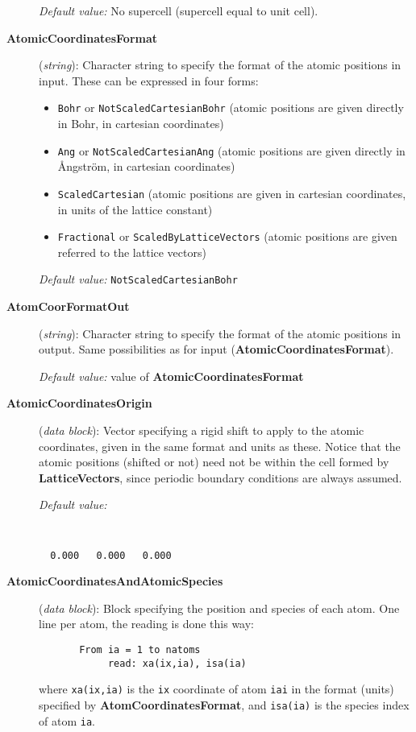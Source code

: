 \documentclass[11pt]{article}
\begin{document}
\begin{description}
{\it Default value:} No supercell (supercell equal to unit cell).


\item[{\bf AtomicCoordinatesFormat}] ({\it string}): 
Character string to specify the format of the atomic positions in
input. These can be expressed in four forms:
\begin{itemize}
\item {\tt Bohr} or {\tt NotScaledCartesianBohr} (atomic positions 
are given directly in Bohr, in cartesian coordinates)
\item {\tt Ang} or {\tt NotScaledCartesianAng} (atomic positions 
are given directly in {\AA}ngstr\"om, in cartesian coordinates)
\item {\tt ScaledCartesian} (atomic positions are given 
in cartesian coordinates, in units of the lattice constant)
\item {\tt Fractional} or {\tt ScaledByLatticeVectors} (atomic positions 
are given referred to the lattice vectors)
\end{itemize}

{\it Default value:} {\tt NotScaledCartesianBohr}


\item[{\bf AtomCoorFormatOut}] ({\it string}): 
Character string to specify the format of the atomic positions in output.
Same possibilities as for input ({\bf AtomicCoordinatesFormat}).

{\it Default value:} value of {\bf AtomicCoordinatesFormat}


\item[{\bf AtomicCoordinatesOrigin}] ({\it data block}): 
Vector specifying a rigid shift to apply to the atomic coordinates,
given in the same format and units as these. Notice that the atomic
positions (shifted or not) need not be within the cell formed by
{\bf LatticeVectors}, since periodic boundary conditions are always
assumed.

{\it Default value:} 
{\tt
\begin{verbatim}
  0.000   0.000   0.000
\end{verbatim}
}

\item[{\bf AtomicCoordinatesAndAtomicSpecies}] ({\it data block}): 
Block specifying the position and species of each atom.
One line per atom, the reading is done this way:
\begin{verbatim}
       From ia = 1 to natoms
            read: xa(ix,ia), isa(ia)
\end{verbatim}
where {\tt xa(ix,ia)} is the {\tt ix} coordinate of atom 
{\tt iai} in the format (units) specified by
{\bf AtomCoordinatesFormat}, and {\tt isa(ia)} is the species 
index of atom {\tt ia}.


\end{description}
\end{document}

